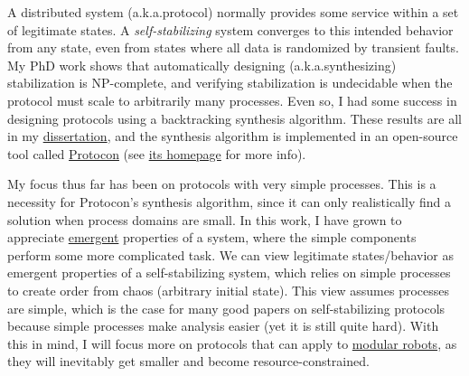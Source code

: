
\newcommand{\AKA}{a.k.a.}



A distributed system (\AKA protocol) normally provides some service within a set of legitimate states.
A \textit{self-stabilizing} system converges to this intended behavior from any state, even from states where all data is randomized by transient faults.
My PhD work shows that automatically designing (\AKA synthesizing) stabilization is NP-complete, and verifying stabilization is undecidable when the protocol must scale to arbitrarily many processes.
Even so, I had some success in designing protocols using a backtracking synthesis algorithm.
These results are all in my \href{limpract.pdf}{dissertation}, and the synthesis algorithm is implemented in an open-source tool called
\href{https://github.com/grencez/protocon}{Protocon} (see \href{http://asd.cs.mtu.edu/projects/protocon}{its homepage} for more info).

My focus thus far has been on protocols with very simple processes.
This is a necessity for Protocon's synthesis algorithm, since it can only realistically find a solution when process domains are small.
In this work, I have grown to appreciate \href{https://en.wikipedia.org/wiki/Emergence}{emergent} properties of a system, where the simple components perform some more complicated task.
We can view legitimate states/behavior as emergent properties of a self-stabilizing system, which relies on simple processes to create order from chaos (arbitrary initial state).
This view assumes processes are simple, which is the case for many good papers on self-stabilizing protocols because simple processes make analysis easier (yet it is still quite hard).
With this in mind, I will focus more on protocols that can apply to \href{https://en.wikipedia.org/wiki/Self-reconfiguring_modular_robot}{modular robots}, as they will inevitably get smaller and become resource-constrained.


